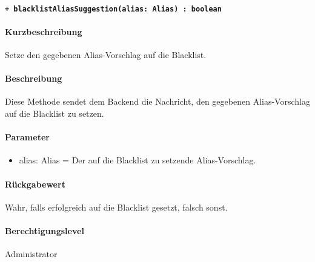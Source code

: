 \paragraph{\texttt{+ blacklistAliasSuggestion(alias: Alias) : boolean}}%
\paragraph*{Kurzbeschreibung}
Setze den gegebenen Alias-Vorschlag auf die Blacklist.
\paragraph*{Beschreibung}
Diese Methode sendet dem Backend die Nachricht, den gegebenen Alias-Vorschlag auf die Blacklist zu setzen.
\paragraph*{Parameter}
\begin{itemize}
    \item alias: Alias = Der auf die Blacklist zu setzende Alias-Vorschlag.
\end{itemize}
\paragraph*{Rückgabewert}
Wahr, falls erfolgreich auf die Blacklist gesetzt, falsch sonst.
\paragraph*{Berechtigungslevel}
Administrator